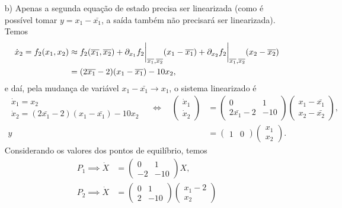 \begin{itemize}
	\item [b)] 
	Apenas a segunda equação de estado precisa ser linearizada 
	(como é possível tomar $y=x_1-\bar{x_1}$, a saída também não precisará ser linearizada).
	Temos 
	\begin{align*}
		\dot{x}_2 = f_2(x_1, x_2) 
		&\approx f_2(\overline{x_1}, \overline{x_2}) 
		+
		\partial_{x_1} f_2\bigg|_{\overline{x_1}, \overline{x_2}}
		(x_1 - \overline{x_1}) 
		+
		\partial_{x_2} f_2\bigg|_{\overline{x_1}, \overline{x_2}}
		(x_2 - \overline{x_2}) \\
		&= (2\overline{x_1} - 2)(x_1 - \overline{x_1}) -
		10x_2,
	\end{align*}
	e daí, pela mudança de variável 
	$x_1-\bar{x_1} \rightarrow x_1$, o sistema linearizado é  
	\begin{align*}
		\begin{array}{l}
			\dot{x}_1 = x_2 \\
			\dot{x}_2 =(2\bar{x_1} - 2)(x_1 - \bar{x_1}) - 10x_2 
		\end{array}
		\quad \iff \quad 
		\begin{pmatrix}
			\dot{x}_1 \\ \dot{x}_2
		\end{pmatrix}
		&= 
		\begin{pmatrix}
			0 & 1 \\
			2\bar{x_1} - 2 & -10 
		\end{pmatrix}
		\begin{pmatrix}
			x_1 - \bar{x_1} \\ x_2 - \bar{x_2}
		\end{pmatrix},
		\\
		y&= \begin{pmatrix} 1 & 0 \end{pmatrix} 
		\begin{pmatrix} x_1 \\ x_2 \end{pmatrix}.
	\end{align*}
	Considerando os valores dos pontos de equilíbrio, temos
	\begin{align*}
		P_1 \implies 
		\dot{X} &= 
		\begin{pmatrix}
			0 & 1 \\
			- 2 & -10 
		\end{pmatrix}
		X, \\
		P_2 \implies 
		\dot{X} &= 
		\begin{pmatrix}
			0 & 1 \\
			2 & -10
		\end{pmatrix}
		\begin{pmatrix}
			x_1-2 \\ x_2
		\end{pmatrix}
	\end{align*}
\end{itemize}
%

